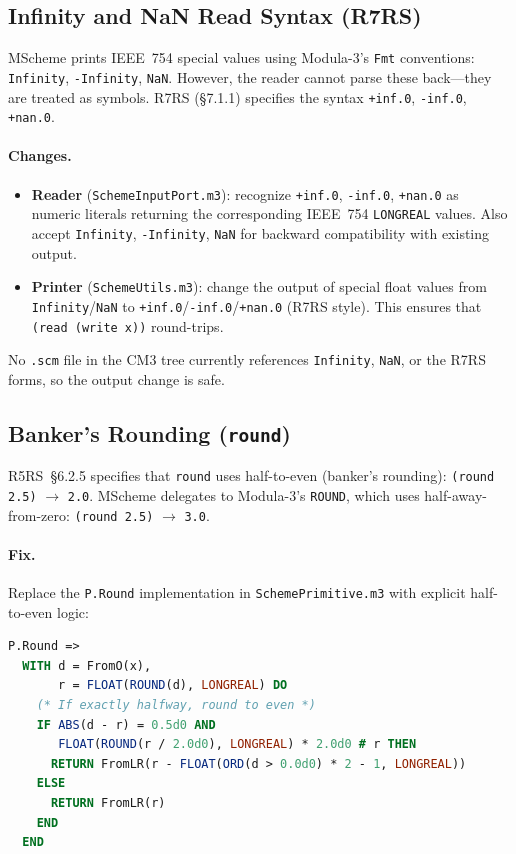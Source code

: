 \documentclass[12pt]{article}
\begin{document}
\subsection{Infinity and NaN Read Syntax (R7RS)}

MScheme prints IEEE~754 special values using Modula-3's {\tt Fmt}
conventions: {\tt Infinity}, {\tt -Infinity}, {\tt NaN}.  However,
the reader cannot parse these back---they are treated as symbols.
R7RS (\S7.1.1) specifies the syntax {\tt +inf.0}, {\tt -inf.0},
{\tt +nan.0}.

\paragraph{Changes.}
\begin{itemize}[nosep]
\item \textbf{Reader} ({\tt SchemeInputPort.m3}): recognize
  {\tt +inf.0}, {\tt -inf.0}, {\tt +nan.0} as numeric literals
  returning the corresponding IEEE~754 {\tt LONGREAL} values.
  Also accept {\tt Infinity}, {\tt -Infinity}, {\tt NaN} for
  backward compatibility with existing output.
\item \textbf{Printer} ({\tt SchemeUtils.m3}): change the
  output of special float values from {\tt Infinity}/{\tt NaN}
  to {\tt +inf.0}/{\tt -inf.0}/{\tt +nan.0} (R7RS style).
  This ensures that {\tt (read (write x))} round-trips.
\end{itemize}

\noindent No {\tt .scm} file in the CM3 tree currently references
{\tt Infinity}, {\tt NaN}, or the R7RS forms, so the output change
is safe.

\subsection{Banker's Rounding ({\tt round})}

R5RS~\S6.2.5 specifies that {\tt round} uses half-to-even
(banker's rounding): {\tt (round 2.5)} $\to$ {\tt 2.0}.
MScheme delegates to Modula-3's {\tt ROUND}, which uses
half-away-from-zero: {\tt (round 2.5)} $\to$ {\tt 3.0}.

\paragraph{Fix.}
Replace the {\tt P.Round} implementation in {\tt SchemePrimitive.m3}
with explicit half-to-even logic:

\begin{lstlisting}[language=Modula3]
P.Round =>
  WITH d = FromO(x),
       r = FLOAT(ROUND(d), LONGREAL) DO
    (* If exactly halfway, round to even *)
    IF ABS(d - r) = 0.5d0 AND
       FLOAT(ROUND(r / 2.0d0), LONGREAL) * 2.0d0 # r THEN
      RETURN FromLR(r - FLOAT(ORD(d > 0.0d0) * 2 - 1, LONGREAL))
    ELSE
      RETURN FromLR(r)
    END
  END
\end{lstlisting}
\end{document}
